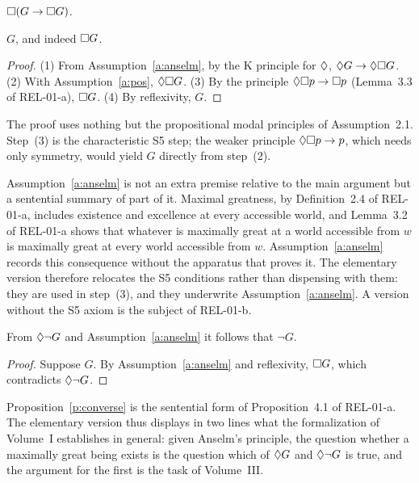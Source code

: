 \documentclass{situationist-preprint}
\begin{document}
\begin{assumption}\label{a:anselm}
$\mathord{\Box}(G \to \mathord{\Box} G)$.
\end{assumption}

\begin{theorem}\label{t:main}
$G$, and indeed $\mathord{\Box} G$.
\end{theorem}

\begin{proof}
(1) From Assumption~\ref{a:anselm}, by the K principle for $\mathord{\Diamond}$, $\mathord{\Diamond} G \to \mathord{\Diamond}\mathord{\Box} G$. (2) With Assumption~\ref{a:pos}, $\mathord{\Diamond}\mathord{\Box} G$. (3) By the principle $\mathord{\Diamond}\mathord{\Box} p \to \mathord{\Box} p$ (Lemma~3.3 of REL-01-a), $\mathord{\Box} G$. (4) By reflexivity, $G$.
\end{proof}

The proof uses nothing but the propositional modal principles of Assumption~2.1. Step~(3) is the characteristic S5 step; the weaker principle $\mathord{\Diamond}\mathord{\Box} p \to p$, which needs only symmetry, would yield $G$ directly from step~(2).

Assumption~\ref{a:anselm} is not an extra premise relative to the main argument but a sentential summary of part of it. Maximal greatness, by Definition~2.4 of REL-01-a, includes existence and excellence at every accessible world, and Lemma~3.2 of REL-01-a shows that whatever is maximally great at a world accessible from $w$ is maximally great at every world accessible from $w$. Assumption~\ref{a:anselm} records this consequence without the apparatus that proves it. The elementary version therefore relocates the S5 conditions rather than dispensing with them: they are used in step~(3), and they underwrite Assumption~\ref{a:anselm}. A version without the S5 axiom is the subject of REL-01-b.

\begin{proposition}\label{p:converse}
From $\mathord{\Diamond}\neg G$ and Assumption~\ref{a:anselm} it follows that $\neg G$.
\end{proposition}

\begin{proof}
Suppose $G$. By Assumption~\ref{a:anselm} and reflexivity, $\mathord{\Box} G$, which contradicts $\mathord{\Diamond}\neg G$.
\end{proof}

Proposition~\ref{p:converse} is the sentential form of Proposition~4.1 of REL-01-a. The elementary version thus displays in two lines what the formalization of Volume~I establishes in general: given Anselm's principle, the question whether a maximally great being exists is the question which of $\mathord{\Diamond} G$ and $\mathord{\Diamond}\neg G$ is true, and the argument for the first is the task of Volume~III.
\end{document}
